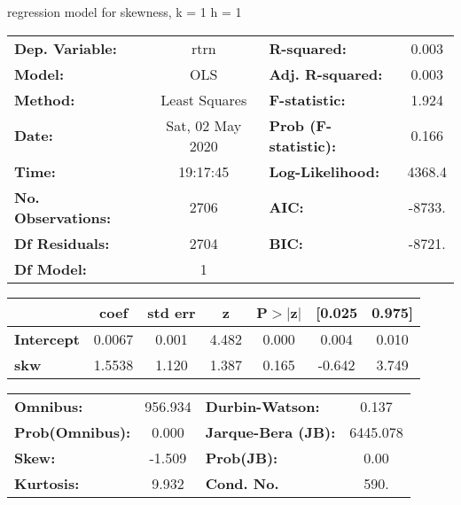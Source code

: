 regression model for skewness, k = 1 h = 1\begin{center}
\begin{tabular}{lclc}
\toprule
\textbf{Dep. Variable:}    &       rtrn       & \textbf{  R-squared:         } &     0.003   \\
\textbf{Model:}            &       OLS        & \textbf{  Adj. R-squared:    } &     0.003   \\
\textbf{Method:}           &  Least Squares   & \textbf{  F-statistic:       } &     1.924   \\
\textbf{Date:}             & Sat, 02 May 2020 & \textbf{  Prob (F-statistic):} &    0.166    \\
\textbf{Time:}             &     19:17:45     & \textbf{  Log-Likelihood:    } &    4368.4   \\
\textbf{No. Observations:} &        2706      & \textbf{  AIC:               } &    -8733.   \\
\textbf{Df Residuals:}     &        2704      & \textbf{  BIC:               } &    -8721.   \\
\textbf{Df Model:}         &           1      & \textbf{                     } &             \\
\bottomrule
\end{tabular}
\begin{tabular}{lcccccc}
                   & \textbf{coef} & \textbf{std err} & \textbf{z} & \textbf{P$> |$z$|$} & \textbf{[0.025} & \textbf{0.975]}  \\
\midrule
\textbf{Intercept} &       0.0067  &        0.001     &     4.482  &         0.000        &        0.004    &        0.010     \\
\textbf{skw}       &       1.5538  &        1.120     &     1.387  &         0.165        &       -0.642    &        3.749     \\
\bottomrule
\end{tabular}
\begin{tabular}{lclc}
\textbf{Omnibus:}       & 956.934 & \textbf{  Durbin-Watson:     } &    0.137  \\
\textbf{Prob(Omnibus):} &   0.000 & \textbf{  Jarque-Bera (JB):  } & 6445.078  \\
\textbf{Skew:}          &  -1.509 & \textbf{  Prob(JB):          } &     0.00  \\
\textbf{Kurtosis:}      &   9.932 & \textbf{  Cond. No.          } &     590.  \\
\bottomrule
\end{tabular}
\end{center}

